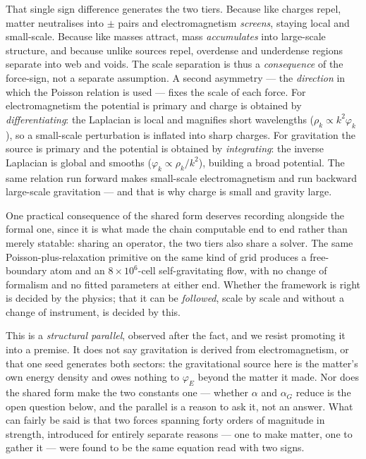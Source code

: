 \documentclass[11pt]{article}
\begin{document}
That single sign difference generates the two tiers. Because like charges repel, matter neutralises into $\pm$
pairs and electromagnetism \emph{screens}, staying local and small-scale. Because like masses attract, mass
\emph{accumulates} into large-scale structure, and because unlike sources repel, overdense and underdense regions
separate into web and voids. The scale separation is thus a \emph{consequence} of the force-sign, not a separate
assumption. A second asymmetry --- the \emph{direction} in which the Poisson relation is used --- fixes the scale
of each force. For electromagnetism the potential is primary and charge is obtained by \emph{differentiating}: the
Laplacian is local and magnifies short wavelengths ($\rho_k\propto k^2\varphi_k$), so a small-scale perturbation is
inflated into sharp charges. For gravitation the source is primary and the potential is obtained by
\emph{integrating}: the inverse Laplacian is global and smooths ($\varphi_k\propto\rho_k/k^2$), building a broad
potential. The same relation run forward makes small-scale electromagnetism and run backward large-scale
gravitation --- and that is why charge is small and gravity large.

One practical consequence of the shared form deserves recording alongside the formal one, since it is what made
the chain computable end to end rather than merely statable: sharing an operator, the two tiers also share a
solver. The same Poisson-plus-relaxation primitive on the same kind of grid produces a free-boundary atom and an
$8\times10^6$-cell self-gravitating flow, with no change of formalism and no fitted parameters at either end.
Whether the framework is right is decided by the physics; that it can be \emph{followed}, scale by scale and
without a change of instrument, is decided by this.

This is a \emph{structural parallel}, observed after the fact, and we resist promoting it into a premise. It does
not say gravitation is derived from electromagnetism, or that one seed generates both sectors: the gravitational
source here is the matter's own energy density and owes nothing to $\varphi_E$ beyond the matter it made. Nor does
the shared form make the two constants one --- whether $\alpha$ and $\alpha_G$ reduce is the open question below,
and the parallel is a reason to ask it, not an answer. What can fairly be said is that two forces spanning forty
orders of magnitude in strength, introduced for entirely separate reasons --- one to make matter, one to gather it
--- were found to be the same equation read with two signs.
\end{document}
